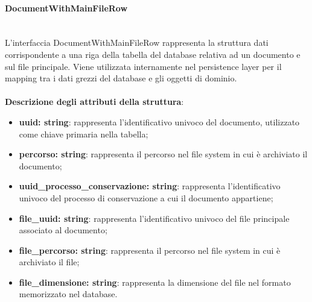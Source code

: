 \documentclass[a4paper,12pt]{article}
\begin{document}
                \paragraph{DocumentWithMainFileRow}\label{par:DocumentWithMainFileRow}\mbox{}\\
                L'interfaccia DocumentWithMainFileRow rappresenta la struttura dati corrispondente a una riga della tabella del database relativa ad un documento e sul file principale. Viene utilizzata internamente nel persistence layer per il mapping tra i dati grezzi del database e gli oggetti di dominio.\\
                \\
                \textbf{Descrizione degli attributi della struttura}:
                \begin{itemize}
                    \item \textbf{uuid: string}: rappresenta l'identificativo univoco del documento, utilizzato come chiave primaria nella tabella;
                    \item \textbf{percorso: string}: rappresenta il percorso nel file system in cui è archiviato il documento;
                    \item \textbf{uuid\_processo\_conservazione: string}: rappresenta l'identificativo univoco del processo di conservazione a cui il documento appartiene;
                    \item \textbf{file\_uuid: string}: rappresenta l'identificativo univoco del file principale associato al documento;
                    \item \textbf{file\_percorso: string}: rappresenta il percorso nel file system in cui è archiviato il file;
                    \item \textbf{file\_dimensione: string}: rappresenta la dimensione del file nel formato memorizzato nel database.
                \end{itemize}
 
\end{document}
